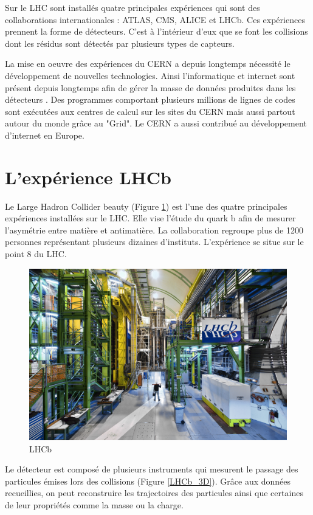 \documentclass[a4paper]{report}
\begin{document}
Sur le LHC sont installés quatre principales expériences qui sont des collaborations internationales : ATLAS, CMS, ALICE et LHCb.
Ces expériences prennent la forme de détecteurs. C'est à l'intérieur d'eux que se font les collisions dont les résidus sont détectés par plusieurs types de capteurs.

La mise en oeuvre des expériences du CERN a depuis longtemps nécessité le développement de nouvelles technologies.
Ainsi l'informatique et internet sont présent depuis longtemps afin de gérer la masse de données produites dans les détecteurs \cite{Saikumar:2022mgb}.
Des programmes comportant plusieurs millions de lignes de codes sont exécutées aux centres de calcul sur les sites du CERN mais aussi partout autour du monde grâce au "Grid".
Le CERN a aussi contribué au développement d'internet en Europe.

\section{L'expérience LHCb}
Le Large Hadron Collider beauty (Figure \ref{LHCb}) est l'une des quatre principales expériences installées sur le LHC.
Elle vise l'étude du quark b afin de mesurer l'asymétrie entre matière et antimatière.
La collaboration regroupe plus de 1200 personnes représentant plusieurs dizaines d'instituts.
L'expérience se situe sur le point 8 du LHC.

\begin{figure}[H]
    \includegraphics[width=\textwidth, center]{LHCb.jpg}
    \caption{LHCb}
    \label{LHCb}
\end{figure}

Le détecteur est composé de plusieurs instruments qui mesurent le passage des particules émises lors des collisions (Figure \ref{LHCb_3D}).
Grâce aux données recueillies, on peut reconstruire les trajectoires des particules ainsi que certaines de leur propriétés comme la masse ou la charge.
\end{document}
